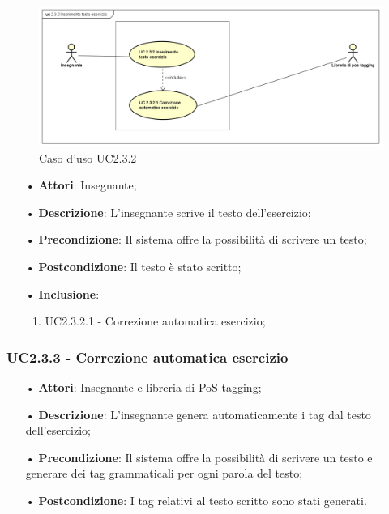 \begin{figure}[H]
	\centering
	\includegraphics[width=17cm]{img/UC232.png} 
	\caption{Caso d'uso UC2.3.2}
\end{figure}

\begin{itemize}
	\item[•] \textbf{Attori}: Insegnante;
	\item[•] \textbf{Descrizione}: L'insegnante scrive il testo dell’esercizio;
	\item[•] \textbf{Precondizione}: Il sistema offre la possibilità di scrivere un testo;
	\item[•] \textbf{Postcondizione}: Il testo è stato scritto;
	\item[•] \textbf{Inclusione}:
	\begin{enumerate}
	\item UC2.3.2.1 - Correzione automatica esercizio;
	\end{enumerate}
\end{itemize}


\subsubsection{UC2.3.3 - Correzione automatica esercizio}
\begin{itemize}
	\item[•] \textbf{Attori}: Insegnante e libreria di PoS-tagging;
	\item[•] \textbf{Descrizione}: L’insegnante genera automaticamente i tag dal testo dell’esercizio;
	\item[•] \textbf{Precondizione}: Il sistema offre la possibilità di scrivere un testo e generare dei tag grammaticali per ogni parola del testo;
	\item[•] \textbf{Postcondizione}: I tag relativi al testo scritto sono stati generati.
\end{itemize}


